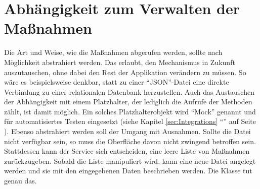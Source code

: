 
\ifodd\value{page}\hbox{}\newpage\fi
\section{ Abhängigkeit zum Verwalten der Maßnahmen}

Die Art und Weise, wie die Maßnahmen abgerufen werden, sollte nach Möglichkeit abstrahiert werden.
Das erlaubt, den Mechanismus in Zukunft auszutauschen, ohne dabei den Rest der Applikation verändern zu müssen.
So wäre es beispielsweise denkbar, statt zu einer \enquote{JSON}-Datei eine direkte Verbindung zu einer relationalen Datenbank herzustellen.
Auch das Austauschen der Abhängigkeit mit einem Platzhalter, der lediglich die Aufrufe der Methoden zählt, ist damit möglich.
Ein solches Platzhalterobjekt wird \enquote{Mock} genannt und für automatisiertes Testen eingesetzt (siehe Kapitel \ref{sec:Integrations} \enquote{} auf Seite \pageref{sec:Integrations}).
Ebenso abstrahiert werden soll der Umgang mit Ausnahmen.
Sollte die Datei nicht verfügbar sein, so muss die Oberfläche davon nicht zwingend betroffen sein.
Stattdessen kann der Service sich entscheiden, eine leere Liste von Maßnahmen zurückzugeben.
Sobald die Liste manipuliert wird, kann eine neue Datei angelegt werden und sie mit den eingegebenen Daten beschrieben werden.
Die Klasse  \Lst{\ref{lst:Schritt1KlasseMassnahmenModel}} tut genau das.



